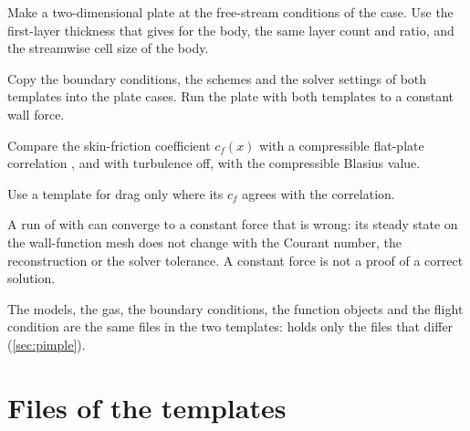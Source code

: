 \begin{steps}
\item Make a two-dimensional plate at the free-stream conditions of the case. Use the
  first-layer thickness that  gives for the body, the same
  layer count and ratio, and the streamwise cell size of the body.
\item Copy the boundary conditions, the schemes and the solver settings of both
  templates into the plate cases. Run the plate with both templates to a constant
  wall force.
\item Compare the skin-friction coefficient $c_f(x)$ with a compressible flat-plate
  correlation \citep[§7]{white2006}, and with turbulence off, with the compressible
  Blasius value.
\item Use a template for drag only where its $c_f$ agrees with the correlation.
\end{steps}

\begin{caution}
A run of  with  can converge to a constant force
that is wrong: its steady state on the wall-function mesh does not change with the
Courant number, the reconstruction or the solver tolerance. A constant force is not a
proof of a correct solution.
\end{caution}

The models, the gas, the boundary conditions, the function objects and the flight
condition are the same files in the two templates:  holds only the
files that differ (\cref{sec:pimple}).

\section{Files of the templates}


